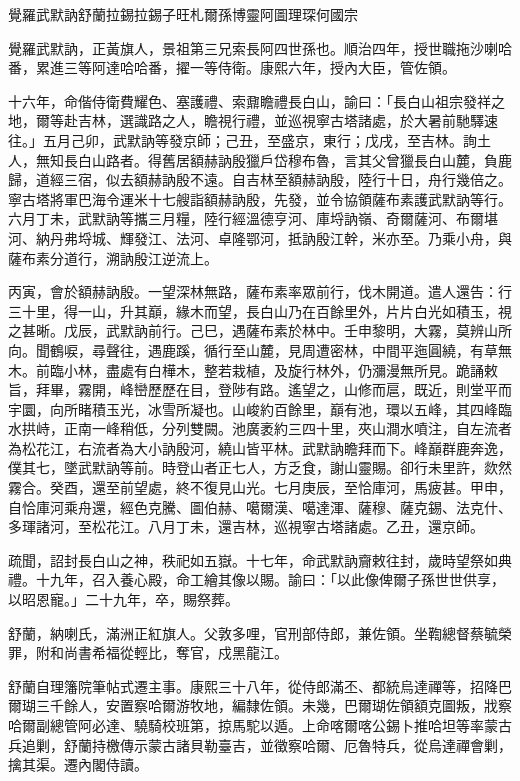
\begin{pinyinscope}
覺羅武默訥舒蘭拉錫拉錫子旺札爾孫博靈阿圖理琛何國宗

覺羅武默訥，正黃旗人，景祖第三兄索長阿四世孫也。順治四年，授世職拖沙喇哈番，累進三等阿達哈哈番，擢一等侍衛。康熙六年，授內大臣，管佐領。

十六年，命偕侍衛費耀色、塞護禮、索鼐瞻禮長白山，諭曰：「長白山祖宗發祥之地，爾等赴吉林，選識路之人，瞻視行禮，並巡視寧古塔諸處，於大暑前馳驛速往。」五月己卯，武默訥等發京師；己丑，至盛京，東行；戊戌，至吉林。詢土人，無知長白山路者。得舊居額赫訥殷獵戶岱穆布魯，言其父曾獵長白山麓，負鹿歸，道經三宿，似去額赫訥殷不遠。自吉林至額赫訥殷，陸行十日，舟行幾倍之。寧古塔將軍巴海令運米十七艘詣額赫訥殷，先發，並令協領薩布素護武默訥等行。六月丁未，武默訥等攜三月糧，陸行經溫德亨河、庫埒訥嶺、奇爾薩河、布爾堪河、納丹弗埒城、輝發江、法河、卓隆鄂河，抵訥殷江幹，米亦至。乃乘小舟，與薩布素分道行，溯訥殷江逆流上。

丙寅，會於額赫訥殷。一望深林無路，薩布素率眾前行，伐木開道。遣人還告：行三十里，得一山，升其巔，緣木而望，長白山乃在百餘里外，片片白光如積玉，視之甚晰。戊辰，武默訥前行。己巳，遇薩布素於林中。壬申黎明，大霧，莫辨山所向。聞鶴唳，尋聲往，遇鹿蹊，循行至山麓，見周遭密林，中間平迤圓繞，有草無木。前臨小林，盡處有白樺木，整若栽植，及旋行林外，仍瀰漫無所見。跪誦敕旨，拜畢，霧開，峰巒歷歷在目，登陟有路。遙望之，山修而扈，既近，則堂平而宇圜，向所睹積玉光，冰雪所凝也。山峻約百餘里，巔有池，環以五峰，其四峰臨水拱峙，正南一峰稍低，分列雙闕。池廣袤約三四十里，夾山澗水噴注，自左流者為松花江，右流者為大小訥殷河，繞山皆平林。武默訥瞻拜而下。峰巔群鹿奔逸，僕其七，墜武默訥等前。時登山者正七人，方乏食，謝山靈賜。卻行未里許，欻然霧合。癸酉，還至前望處，終不復見山光。七月庚辰，至恰庫河，馬疲甚。甲申，自恰庫河乘舟還，經色克騰、圖伯赫、噶爾漢、噶達渾、薩穆、薩克錫、法克什、多琿諸河，至松花江。八月丁未，還吉林，巡視寧古塔諸處。乙丑，還京師。

疏聞，詔封長白山之神，秩祀如五嶽。十七年，命武默訥齎敕往封，歲時望祭如典禮。十九年，召入養心殿，命工繪其像以賜。諭曰：「以此像俾爾子孫世世供享，以昭恩寵。」二十九年，卒，賜祭葬。

舒蘭，納喇氏，滿洲正紅旗人。父敦多哩，官刑部侍郎，兼佐領。坐鞫總督蔡毓榮罪，附和尚書希福從輕比，奪官，戍黑龍江。

舒蘭自理籓院筆帖式遷主事。康熙三十八年，從侍郎滿丕、都統烏達禪等，招降巴爾瑚三千餘人，安置察哈爾游牧地，編隸佐領。未幾，巴爾瑚佐領額克圖叛，戕察哈爾副總管阿必達、驍騎校班第，掠馬駝以遁。上命喀爾喀公錫卜推哈坦等率蒙古兵追剿，舒蘭持檄傳示蒙古諸貝勒臺吉，並徵察哈爾、厄魯特兵，從烏達禪會剿，擒其渠。遷內閣侍讀。


\end{pinyinscope}
